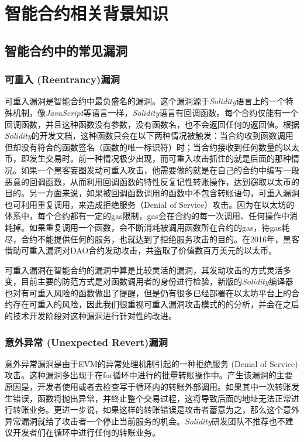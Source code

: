 
\chapter{智能合约相关背景知识}

\section{智能合约中的常见漏洞}

\subsection{可重入 (Reentrancy)漏洞}

可重入漏洞是智能合约中最负盛名的漏洞。这个漏洞源于\emph{Solidity}语言上的一个特殊机制，像\emph{JavaScript}等语言一样，\emph{Solidity}语言有回调函数。每个合约仅能有一个回调函数，并且这种函数没有参数，没有函数名，也不会返回任何的返回值。根据\emph{Solidity}的开发文档，这种函数只会在以下两种情况被触发：当合约收到函数调用但却没有符合的函数签名（函数的唯一标识符）时；当合约接收到任何数量的以太币，即发生交易时。前一种情况极少出现，而可重入攻击抓住的就是后面的那种情况。如果一个黑客妄图发动可重入攻击，他需要做的就是在自己的合约中编写一段恶意的回调函数，从而利用回调函数的特性反复记性转账操作，达到窃取以太币的目的。另一方面来说，如果被回调函数调用的函数中不包含转账语句，可重入漏洞也可利用重复调用，来造成拒绝服务（Denial of Service）攻击。因为在以太坊的体系中，每个合约都有一定的gas限制，gas会在合约的每一次调用、任何操作中消耗掉。如果重复调用一个函数，会不断消耗被调用函数所在合约的gas，待gas耗尽，合约不能提供任何的服务，也就达到了拒绝服务攻击的目的。在2016年，黑客借助可重入漏洞对DAO合约发动攻击，共盗取了价值数百万美元的以太币。

可重入漏洞在智能合约的漏洞中算是比较灵活的漏洞，其发动攻击的方式灵活多变，目前主要的防范方式是对函数调用者的身份进行检验，新版的\emph{Solidity}编译器也对有可重入风险的函数做出了提醒，但是仍有很多已经部署在以太坊平台上的合约存在可重入的风险，因此我们很重视可重入漏洞攻击模式的的分析，并会在之后的技术开发阶段对这种漏洞进行针对性的改进。

\subsection{意外异常 (Unexpected Revert)漏洞}

意外异常漏洞是由于EVM的异常处理机制引起的一种拒绝服务 (Denial of Service) 攻击。这种漏洞多出现于在for循环中进行的批量转账操作中。产生该漏洞的主要原因是，开发者使用或者去检查写于循环内的转账外部调用。如果其中一次转账发生错误，函数将抛出异常，并终止整个交易过程，这将导致后面的地址无法正常进行转账业务。更进一步说，如果这样的转账错误是攻击者蓄意为之，那么这个意外异常漏洞就给了攻击者一个停止当前服务的机会。\emph{Solidity}研发团队不推荐也不建议开发者们在循环中进行任何的转账业务。

